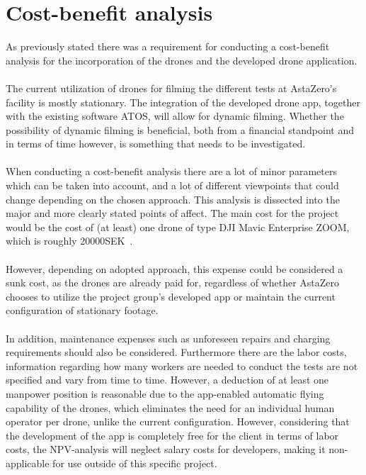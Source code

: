 \section{Cost-benefit analysis} \label{res:COSTBENEFIT}
As previously stated there was a requirement for conducting a cost-benefit analysis for the incorporation of the drones and the developed drone application. 
\\ \\
The current utilization of drones for filming the different tests at AstaZero’s facility is mostly stationary. The integration of the developed drone app, together with the existing software ATOS, will allow for dynamic filming. Whether the possibility of dynamic filming is beneficial, both from a financial standpoint and in terms of time however, is something that needs to be investigated. 
\\ \\
When conducting a cost-benefit analysis there are a lot of minor parameters which can be taken into account, and a lot of different viewpoints that could change depending on the chosen approach. This analysis is dissected into the major and more clearly stated points of affect. 
The main cost for the project would be the cost of (at least) one drone of type DJI Mavic Enterprise ZOOM, which is roughly 20000SEK~\cite{DJI_stockholm}.
\\ \\
However, depending on adopted approach, this expense could be considered a sunk cost, as the drones are already paid for, regardless of whether AstaZero chooses to utilize the project group's developed app or maintain the current configuration of stationary footage.
\\ \\
In addition, maintenance expenses such as unforeseen repairs and charging requirements should also be considered.
Furthermore there are the labor costs, information regarding how many workers are needed to conduct the tests are not specified and vary from time to time. However, a deduction of at least one manpower position is reasonable due to the app-enabled automatic flying capability of the drones, which eliminates the need for an individual human operator per drone, unlike the current configuration. However, considering that the development of the app is completely free for the client in terms of labor costs, the NPV-analysis will neglect salary costs for developers, making it non-applicable for use outside of this specific project.  
\\ \\
